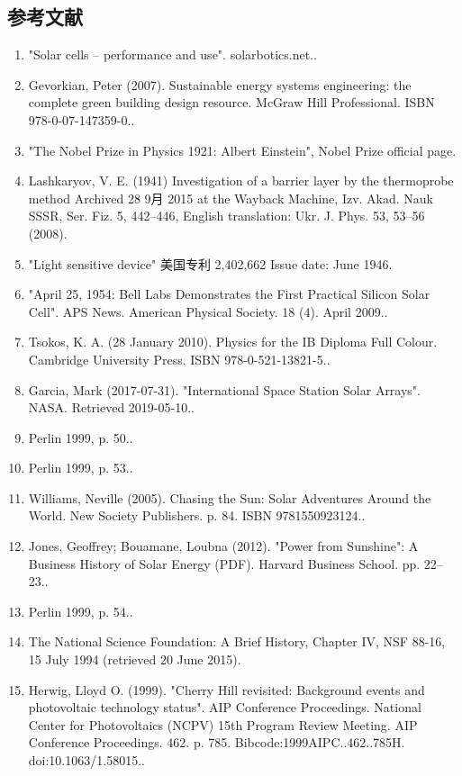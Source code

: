 \subsection{参考文献}

\begin{enumerate}
\item "Solar cells – performance and use". solarbotics.net..
\item Gevorkian, Peter (2007). Sustainable energy systems engineering: the complete green building design resource. McGraw Hill Professional. ISBN 978-0-07-147359-0..
\item "The Nobel Prize in Physics 1921: Albert Einstein", Nobel Prize official page.
\item Lashkaryov, V. E. (1941) Investigation of a barrier layer by the thermoprobe method Archived 28 9月 2015 at the Wayback Machine, Izv. Akad. Nauk SSSR, Ser. Fiz. 5, 442–446, English translation: Ukr. J. Phys. 53, 53–56 (2008).
\item "Light sensitive device" 美国专利 2,402,662 Issue date: June 1946.
\item "April 25, 1954: Bell Labs Demonstrates the First Practical Silicon Solar Cell". APS News. American Physical Society. 18 (4). April 2009..
\item Tsokos, K. A. (28 January 2010). Physics for the IB Diploma Full Colour. Cambridge University Press. ISBN 978-0-521-13821-5..
\item Garcia, Mark (2017-07-31). "International Space Station Solar Arrays". NASA. Retrieved 2019-05-10..
\item Perlin 1999, p. 50..
\item Perlin 1999, p. 53..
\item Williams, Neville (2005). Chasing the Sun: Solar Adventures Around the World. New Society Publishers. p. 84. ISBN 9781550923124..
\item Jones, Geoffrey; Bouamane, Loubna (2012). "Power from Sunshine": A Business History of Solar Energy (PDF). Harvard Business School. pp. 22–23..
\item Perlin 1999, p. 54..
\item The National Science Foundation: A Brief History, Chapter IV, NSF 88-16, 15 July 1994 (retrieved 20 June 2015).
\item Herwig, Lloyd O. (1999). "Cherry Hill revisited: Background events and photovoltaic technology status". AIP Conference Proceedings. National Center for Photovoltaics (NCPV) 15th Program Review Meeting. AIP Conference Proceedings. 462. p. 785. Bibcode:1999AIPC..462..785H. doi:10.1063/1.58015..

\end{enumerate}
